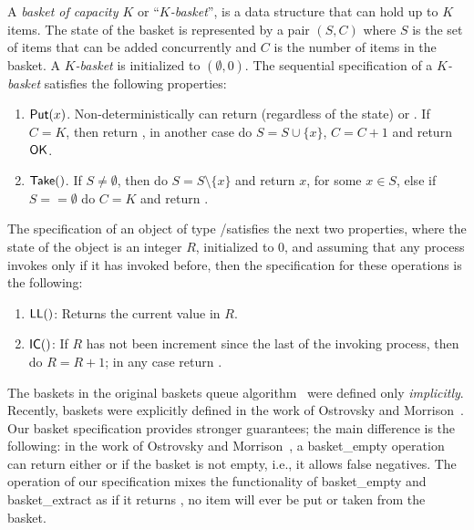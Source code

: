 \begin{definition}[\(K\)-Basket]
\label{chapter-5:def:k-basket}
A \emph{basket of capacity $K$} or ``\emph{$K$-basket}'', is a data structure that can hold up to $K$ items. The state of the basket is represented by a pair $(S, C)$ where $S$ is the set of items that can be added concurrently and $C$ is the number of items in the basket. A \emph{$K$-basket} is initialized to $(\emptyset, 0)$. The sequential specification of a \emph{$K$-basket} satisfies the following properties:

\begin{enumerate}
    \item ${\sf Put}(x)$. Non-deterministically can return \full (regardless of the state) or \ok. If $C = K$, then return \full, in another case do $S = S \cup \{x\}$, $C = C +1$ and return ${\sf OK}$.
    \item ${\sf Take}()$. If $S \neq \emptyset$, then do $S = S \setminus \{x\}$ and return $x$, for some $x \in S$, else if $S == \emptyset$ do $C = K$ and return \closed.
\end{enumerate}
\end{definition}

\begin{definition}
  \label{chapter-5:def:ll-ic}
    The specification of an object of type \LL/\IC satisfies the next two properties, where the state of the object is an integer $R$, initialized to 0, and assuming that any process invokes \IC only if it has invoked \LL before, then the specification for these operations is the following:

    \begin{enumerate}
    \item ${\sf LL}()$: Returns the current value in $R$.
    \item ${\sf IC}()$: If $R$ has not been increment since the last \LL of the invoking process,
    then do $R = R + 1$; in any case return \ok.
    \end{enumerate}
\end{definition}

The baskets in the original baskets queue algorithm~\cite{basketqueue2007} were defined only \emph{implicitly}. Recently, baskets were explicitly defined in the work of Ostrovsky and Morrison~\cite{scalingconcurrent2020}. Our basket specification provides stronger guarantees; the main difference is the following: in the work of Ostrovsky and Morrison~\cite{scalingconcurrent2020}, a {\sf basket\_empty} operation can return either \true or \false if the basket is not empty, i.e., it allows false negatives. The \Take operation of our specification mixes the functionality of {\sf basket\_empty} and {\sf basket\_extract} as if it returns \closed, no item will ever be put or taken from the basket.

